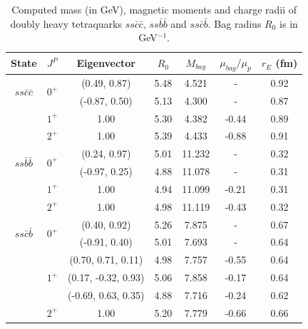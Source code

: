 \documentclass[12pt,prd,onecolumn,floatfix,nofootinbib]{revtex4}
\begin{document}
\renewcommand{\tabcolsep}{0.60cm} \renewcommand{\arraystretch}{1.1}
\begin{table}[!htb]
\caption{Computed mass (in GeV), magnetic moments and charge radii of doubly
heavy tetraquarks $ss\bar{c}\bar{c}$, $ss\bar{b}\bar{b}$ and $ss\bar{c}\bar{b%
}$. Bag radius $R_{0}$ is in GeV$^{-1}$. }
\label{tab:2heavytetraquark0}%
\begin{tabular}{ccccccc}
\hline\hline
\textrm{State} & $J^{P}$ & \textrm{Eigenvector} & $R_{0}$ & $M_{bag}$ & $%
\mu_{bag}/\mu_{p}$ & $r_{E}$ (fm) \\ \hline
\multirow{2}{*}{$ss\bar{c}\bar{c}$} & \multirow{2}{*}{$0^{+}$} & (0.49, 0.87)
& 5.48 & 4.521 & - & 0.92 \\
&  & (-0.87, 0.50) & 5.13 & 4.300 & - & 0.87 \\
& $1^{+}$ & 1.00 & 5.30 & 4.382 & -0.44 & 0.89 \\
& $2^{+}$ & 1.00 & 5.39 & 4.433 & -0.88 & 0.91 \\
\multirow{2}{*}{$ss\bar{b}\bar{b}$} & \multirow{2}{*}{$0^{+}$} & (0.24, 0.97)
& 5.01 & 11.232 & - & 0.32 \\
&  & (-0.97, 0.25) & 4.88 & 11.078 & - & 0.31 \\
& $1^{+}$ & 1.00 & 4.94 & 11.099 & -0.21 & 0.31 \\
& $2^{+}$ & 1.00 & 4.98 & 11.119 & -0.43 & 0.32 \\
\multirow{2}{*}{$ss\bar{c}\bar{b}$} & \multirow{2}{*}{$0^{+}$} & (0.40, 0.92)
& 5.26 & 7.875 & - & 0.67 \\
&  & (-0.91, 0.40) & 5.01 & 7.693 & - & 0.64 \\
& \multirow{3}{*}{$1^{+}$} & (0.70, 0.71, 0.11) & 4.98 & 7.757 & -0.55 & 0.64
\\
&  & (0.17, -0.32, 0.93) & 5.06 & 7.858 & -0.17 & 0.64 \\
&  & (-0.69, 0.63, 0.35) & 4.88 & 7.716 & -0.24 & 0.62 \\
& $2^{+}$ & 1.00 & 5.20 & 7.779 & -0.66 & 0.66 \\ \hline\hline
\end{tabular}%
\end{table}
\end{document}
